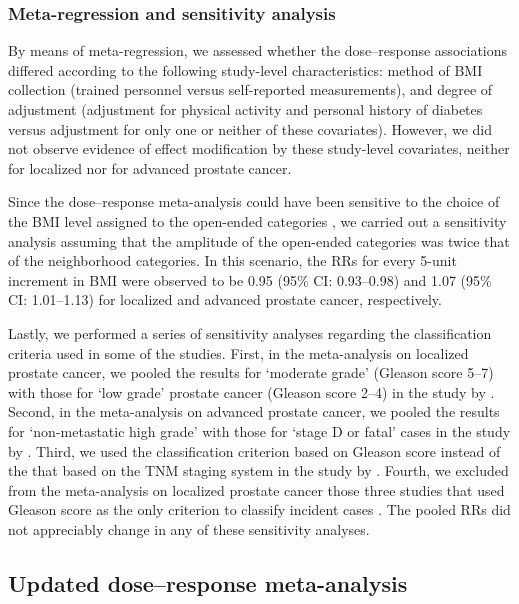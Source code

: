 \subsubsection{Meta-regression and sensitivity analysis}

By means of meta-regression, we assessed whether the dose--response associations differed according to the following study-level characteristics: method of BMI collection (trained personnel versus self-reported measurements), and degree of adjustment (adjustment for physical activity and personal history of diabetes versus adjustment for only one or neither of these covariates). However, we did not observe evidence of effect modification by these study-level covariates, neither for localized nor for advanced prostate cancer.

Since the dose--response meta-analysis could have been sensitive to the choice of the BMI level assigned to the open-ended categories \citep{crippa_letter_2015}, we carried out a sensitivity analysis assuming that the amplitude of the open-ended categories was twice that of the neighborhood categories. In this scenario, the RRs for every 5-unit increment in BMI were observed to be 0.95 (95\% CI: 0.93--0.98) and 1.07 (95\% CI: 1.01--1.13) for localized and advanced prostate cancer, respectively.

Lastly, we performed a series of sensitivity analyses regarding the classification criteria used in some of the studies. First, in the meta-analysis on localized prostate cancer, we pooled the results for `moderate grade' (Gleason score 5--7) with those for `low grade' prostate cancer (Gleason score 2--4) in the study by \citet{macinnis_body_2003}. Second, in the meta-analysis on advanced prostate cancer, we pooled the results for `non-metastatic high grade' with those for `stage D or fatal' cases in the study by \citet{rodriguez_body_2007}. Third, we used the classification criterion based on Gleason score instead of the that based on the TNM staging system in the study by \citet{pischon_body_2008}. Fourth, we excluded from the meta-analysis on localized prostate cancer those three studies that used Gleason score as the only criterion to classify incident cases \citep{cerhan_association_1997, macinnis_body_2003, putnam_lifestyle_2000}. The pooled RRs did not appreciably change in any of these sensitivity analyses. 


\subsection{Updated dose--response meta-analysis}
\label{section:results4updated}

